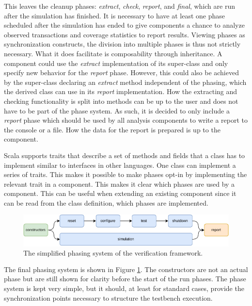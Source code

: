This leaves the cleanup phases: \textit{extract}, \textit{check}, \textit{report}, and \textit{final}, which are run after the simulation has finished. It is necessary
to have at least one phase scheduled after the simulation has ended to give components a chance to analyze observed
transactions and coverage statistics to report results. Viewing phases as synchronization constructs, the
division into multiple phases is thus not strictly necessary. What it does facilitate is composability through
inheritance. A component could use the \textit{extract} implementation of its super-class and only specify new
behavior for the \textit{report} phase. However, this could also be achieved by the super-class declaring an
\textit{extract} method independent of the phasing, which the derived class can use in its \textit{report} implementation. How the extracting and
checking functionality is split into methods can be up to the user and does not have to be part of the phase system.
As such, it is decided to only include a \textit{report} phase which should be used by all analysis components to write a report to the console or a file. How the data for the report is prepared is up to the component.

Scala supports traits that describe a set of methods and fields that a class has to implement similar to interfaces in other languages. One class can
implement a series of traits. This makes it possible to make phases opt-in by implementing the relevant trait in a
component. This makes it clear which phases are used by a component. This can be useful when extending an existing
component since it can be read from the class definition, which phases are implemented.

\begin{figure}
  \centering
  \includegraphics[width=\textwidth]{diagrams/own_phases.pdf}
  \caption{The simplified phasing system of the verification framework.}
  \label{fig:phases}
\end{figure}

The final phasing system is shown in Figure \ref{fig:phases}. The constructors are not an actual phase but are still
shown for clarity before the start of the run phases. The phase system is kept very simple, but it should, at least
for standard cases, provide the synchronization points necessary to structure the testbench execution.

